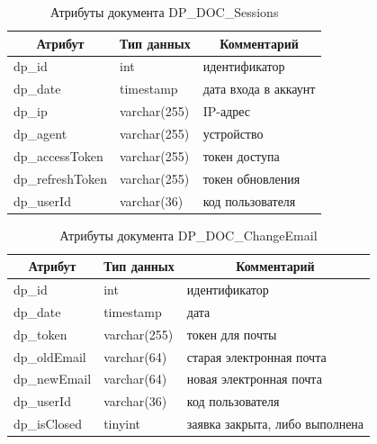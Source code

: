 \begin{table}[p]
    \centering\small

    \caption{Атрибуты документа DP\_DOC\_Sessions}
    \label{tab:DP_DOC_Sessions}

    \begin{tabular}{|p{5cm}|p{2.5cm}|p{9cm}|}
        \hline
        \multicolumn{1}{|c|}{Атрибут}
        & \multicolumn{1}{c|}{Тип данных}
        & \multicolumn{1}{c|}{Комментарий}
        \\ \hline

        dp\_id & int & идентификатор \\ \hline
        dp\_date & timestamp & дата входа в аккаунт \\ \hline
        dp\_ip & varchar(255) & IP-адрес \\ \hline
        dp\_agent & varchar(255) & устройство \\ \hline
        dp\_accessToken & varchar(255) & токен доступа \\ \hline
        dp\_refreshToken & varchar(255) & токен обновления \\ \hline
        dp\_userId & varchar(36) & код пользователя \\ \hline
    \end{tabular}
\end{table}

\begin{table}[p]
    \centering\small

    \caption{Атрибуты документа DP\_DOC\_ChangeEmail}
    \label{tab:DP_DOC_ChangeEmail}

    \begin{tabular}{|p{5cm}|p{2.5cm}|p{9cm}|}
        \hline
        \multicolumn{1}{|c|}{Атрибут}
        & \multicolumn{1}{c|}{Тип данных}
        & \multicolumn{1}{c|}{Комментарий}
        \\ \hline

        dp\_id & int & идентификатор \\ \hline
        dp\_date & timestamp & дата \\ \hline
        dp\_token & varchar(255) & токен для почты \\ \hline
        dp\_oldEmail & varchar(64) & старая электронная почта \\ \hline
        dp\_newEmail & varchar(64) & новая электронная почта \\ \hline
        dp\_userId & varchar(36) & код пользователя \\ \hline
        dp\_isClosed & tinyint & заявка закрыта, либо выполнена \\ \hline
    \end{tabular}
\end{table}

